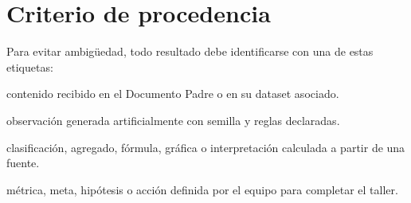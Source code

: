 \section{Criterio de procedencia}

Para evitar ambigüedad, todo resultado debe identificarse con una de estas etiquetas:

\begin{description}[style=nextline,leftmargin=2.5cm,labelwidth=2.2cm]
  \item[Original:] contenido recibido en el Documento Padre o en su dataset asociado.
  \item[Simulado:] observación generada artificialmente con semilla y reglas declaradas.
  \item[Derivado:] clasificación, agregado, fórmula, gráfica o interpretación calculada a partir de una fuente.
  \item[Propuesto:] métrica, meta, hipótesis o acción definida por el equipo para completar el taller.
\end{description}
